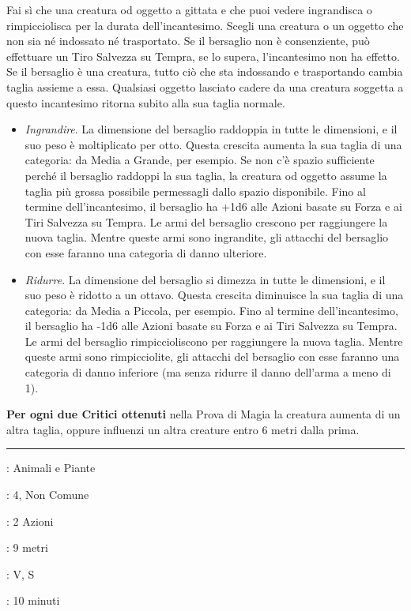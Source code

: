 \begin{multicols}{2}
Fai sì che una creatura od oggetto a gittata e che puoi vedere ingrandisca o rimpicciolisca per la durata dell'incantesimo. Scegli una creatura o un oggetto che non sia né indossato né trasportato. Se il bersaglio non è consenziente, può effettuare un Tiro Salvezza su Tempra, se lo supera, l'incantesimo non ha effetto. Se il bersaglio è una creatura, tutto ciò che sta indossando e trasportando cambia taglia assieme a essa. Qualsiasi oggetto lasciato cadere da una creatura soggetta a questo incantesimo ritorna subito alla sua taglia normale.

\begin{itemize}[leftmargin=*] \setlength{\itemsep}{0pt}
	\item \emph{Ingrandire}. La dimensione del bersaglio raddoppia in tutte le dimensioni, e il suo peso è moltiplicato per otto. Questa crescita aumenta la sua taglia di una categoria: da Media a Grande, per esempio. Se non c'è spazio sufficiente perché il bersaglio raddoppi la sua taglia, la creatura od oggetto assume la taglia più grossa possibile permessagli dallo spazio disponibile. Fino al termine dell'incantesimo, il bersaglio ha +1d6 alle Azioni basate su Forza e ai Tiri Salvezza su Tempra. Le armi del bersaglio crescono per raggiungere la nuova taglia. Mentre queste armi sono ingrandite, gli attacchi del bersaglio con esse faranno una categoria di danno ulteriore.
	\item \emph{Ridurre}. La dimensione del bersaglio si dimezza in tutte le dimensioni, e il suo peso è ridotto a un ottavo. Questa crescita diminuisce la sua taglia di una categoria: da Media a Piccola, per esempio. Fino al termine dell'incantesimo, il bersaglio ha -1d6 alle Azioni basate su Forza e ai Tiri Salvezza su Tempra. Le armi del bersaglio rimpiccioliscono per raggiungere la nuova taglia. Mentre queste armi sono rimpicciolite, gli attacchi del bersaglio con esse faranno una categoria di danno inferiore (ma senza ridurre il danno dell'arma a meno di 1).
\end{itemize}

\textbf{Per ogni due Critici ottenuti} nella Prova di Magia la creatura aumenta di un altra taglia, oppure influenzi un altra creature entro 6 metri dalla prima.

\smallskip\noindent\rule{\linewidth}{2pt} \hypertarget{Insetto Gigante}{}\smallskip{}
\noindent
\begin{description}[noitemsep, topsep=0pt, parsep=0pt, partopsep=0pt, leftmargin=0cm, labelwidth=2.8cm]
	\item[\textbf{Lista di Magia}]: Animali e Piante
	\item[\textbf{Livello}]: 4, Non Comune
	\item[\textbf{T. di Lancio}]: 2 Azioni
	\item[\textbf{Gittata}]: 9 metri
	\item[\textbf{Componenti}]: V, S
	\item[\textbf{Durata}]: 10 minuti
\end{description}


\end{multicols}
